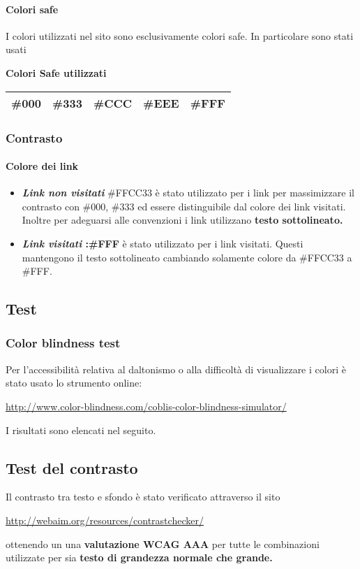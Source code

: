 \documentclass[12pt,a4paper]{article}
\begin{document}
\paragraph{Colori safe}
I colori utilizzati nel sito sono esclusivamente colori safe. In particolare sono stati usati
\begin{center}
	\textbf{Colori Safe utilizzati}
	
	\begin{tabular}{c c c c c}
		\midrule  \#000 & \#333 & \#CCC & \#EEE  &  \#FFF \\ \midrule 
	\end{tabular} 
\end{center}
\subsubsection{Contrasto}
\paragraph{Colore dei link}
\begin{itemize}
	\item \textit{\textbf{Link non visitati}} \#FFCC33 è stato utilizzato per i link per massimizzare il contrasto con \#000, \#333 ed essere distinguibile dal colore dei link visitati. Inoltre per adeguarsi alle convenzioni i link utilizzano \textbf{testo sottolineato.}
	\item \textbf{\textit{Link visitati} :\#FFF }è stato utilizzato per i link visitati. Questi mantengono il testo sottolineato cambiando solamente colore da \#FFCC33 a \#FFF. 
\end{itemize}

\subsection{Test  }
\subsubsection{Color blindness test}
Per l'accessibilità relativa al daltonismo o alla difficoltà di visualizzare i colori è stato usato lo strumento online: 	
\begin{center}
	\url{http://www.color-blindness.com/coblis-color-blindness-simulator/}
\end{center}
I risultati sono elencati nel seguito. 

\subsection{Test del contrasto}
Il contrasto tra testo e sfondo è stato verificato attraverso il sito 
\begin{center}
	\url{http://webaim.org/resources/contrastchecker/}
\end{center}
ottenendo un una \textbf{valutazione WCAG AAA} per tutte le combinazioni utilizzate per sia \textbf{testo di grandezza normale che grande.}
\end{document}
